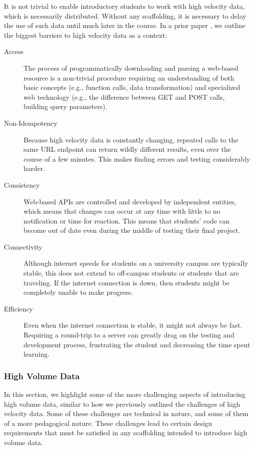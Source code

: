 It is not trivial to enable introductory students to work with high velocity data, which is necessarily distributed. Without any scaffolding, it is necessary to delay the use of such data until much later in the course. In a prior paper \cite{realtimeweb-splashe}, we outline the biggest barriers to high velocity data as a context:
\begin{description}
  \item[Access] The process of programmatically downloading and parsing a web-based resource is a non-trivial procedure requiring an understanding of both basic concepts (e.g., function calls, data transformation) and specialized web technology (e.g., the difference between GET and POST calls, building query parameters).
	\item[Non-Idempotency] Because high velocity data is constantly changing, repeated calls to the same URL endpoint can return wildly different results, even over the course of a few minutes. This makes finding errors and testing considerably harder.
	\item[Consistency] Web-based APIs are controlled and developed by independent entities, which means that changes can occur at any time with little to no notification or time for reaction. This means that students' code can become out of date even during the middle of testing their final project.
	\item[Connectivity] Although internet speeds for students on a university campus are typically stable, this does not extend to off-campus students or students that are traveling. If the internet connection is down, then students might be completely unable to make progress.
	\item[Efficiency] Even when the internet connection is stable, it might not always be fast. Requiring a round-trip to a server can greatly drag on the testing and development process, frustrating the student and decreasing the time spent learning.
\end{description}

\subsubsection{High Volume Data}

In this section, we highlight some of the more challenging aspects of introducing high volume data, similar to how we previously outlined the challenges of high velocity data.
Some of these challenges are technical in nature, and some of them of a more pedagogical nature.
These challenges lead to certain design requirements that must be satisfied in any scaffolding intended to introduce high volume data.

